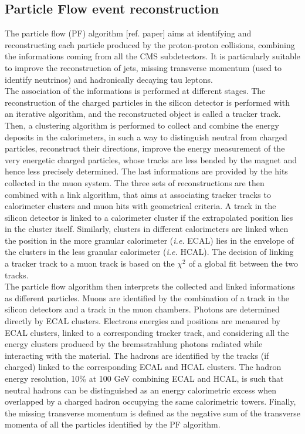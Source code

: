 \subsection{Particle Flow event reconstruction}
The particle flow (PF) algorithm [ref. paper] aims at identifying and reconstructing each particle produced by the proton-proton collisions, combining the informations coming from all the CMS subdetectors. It is particularly suitable to improve the reconstruction of jets, missing transverse momentum (used to identify neutrinos) and hadronically decaying tau leptons.\\
The association of the informations is performed at different stages. The reconstruction of the charged particles in the silicon detector is performed with an iterative algorithm, and the reconstructed object is called a tracker track. Then, a clustering algorithm is performed to collect and combine the energy deposits in the calorimeters, in such a way to distinguish neutral from charged particles, reconstruct their directions, improve the energy measurement of the very energetic charged particles, whose tracks are less bended by the magnet and hence less precisely determined. The last informations are provided by the hits collected in the muon system. The three sets of reconstructions are then combined with a link algorithm, that aims at associating tracker tracks to calorimeter clusters and muon hits with geometrical criteria. A track in the silicon detector is linked to a calorimeter cluster if the extrapolated position lies in the cluster itself. Similarly, clusters in different calorimeters are linked when the position in the more granular calorimeter (\textit{i.e.} ECAL) lies in the envelope of the clusters in the less granular calorimeter (\textit{i.e.} HCAL). The decision of linking a tracker track to a muon track is based on the $\chi^2$ of a global fit between the two tracks.\\
The particle flow algorithm then interprets the collected and linked informations as different particles. Muons are identified by the combination of a track in the silicon detectors and a track in the muon chambers. Photons are determined directly by ECAL clusters. Electrons energies and positions are measured by ECAL clusters, linked to a corresponding tracker track, and considering all the energy clusters produced by the bremsstrahlung photons radiated while interacting with the material. The hadrons are identified by the tracks (if charged) linked to the corresponding ECAL and HCAL clusters. The hadron energy resolution, 10\% at 100 GeV combining ECAL and HCAL, is such that neutral hadrons can be distinguished as an energy calorimetric excess when overlapped by a charged hadron occupying the same calorimetric towers. Finally, the missing transverse momentum is defined as the negative sum of the transverse momenta of all the particles identified by the PF algorithm.\\

